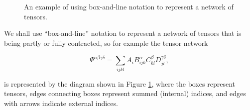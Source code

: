 \documentclass[12pt]{amsbook}
\theoremstyle{plain}
\theoremstyle{definition}
\theoremstyle{remark}
\begin{document}
\begin{figure}
\caption{An example of using box-and-line notation to represent a network of tensors.}
\label{fig:box-line-notation-introduced}
\end{figure}

We shall use ``box-and-line'' notation to represent a network of tensors that is being partly or fully contracted, so for example the tensor network

$$\Psi^{\alpha\beta\gamma\delta} = \sum_{ijkl} A_{i} B_{ijk}^\alpha C_{kl}^\beta D_{jl}^{\gamma\delta},$$

\noindent is represented by the diagram shown in Figure \ref{fig:box-line-notation-introduced}, where the boxes represent tensors, edges connecting boxes represent summed (internal) indices, and edges with arrows indicate external indices.
\end{document}
